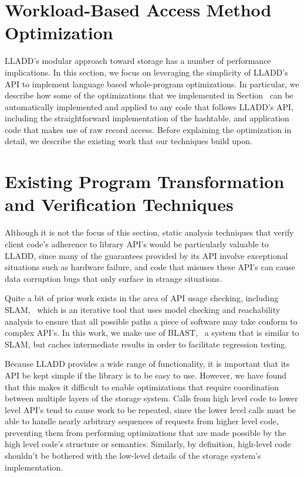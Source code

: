 \documentclass[10pt,letterpaper,twocolumn,english]{article}
\newcommand{\yad}{LLADD\xspace}
\begin{document}
\section{Workload-Based Access Method Optimization}
\label {PL}

\yad's modular approach toward storage has a number of performance
implications.  In this section, we focus on leveraging the simplicity
of \yad's API to implement language based whole-program optimizations.
In particular, we describe how some of the optimizations that we
implemented in Section~\label{optimzedHT} can be automatically
implemented and applied to any code that follows \yad's API, including
the straightforward implementation of the hashtable, and application
code that makes use of raw record access.  Before explaining the
optimization in detail, we describe the existing work that our
techniques build upon.


\section{Existing Program Transformation and Verification Techniques}

\label{prior}




Although it is not the focus of this section, static analysis techniques
that verify client code's adherence to library API's would be
particularly valuable to \yad, since many of the guarantees provided
by its API involve exceptional situations such as hardware failure,
and code that misuses these API's can cause data corruption bugs that
only surface in strange situations.  

Quite a bit of prior work exists
in the area of API usage checking, including SLAM,~\cite{slam} which is an
iterative tool that uses model checking and reachability analysis to
ensure that all possible paths a piece of software may take conform to
complex API's.  In this work, we make use of BLAST,~\cite{blast} a system that is
similar to SLAM, but caches intermediate results in order to
facilitate regression testing.

Because \yad provides a wide range of functionality, it is important
that its API be kept simple if the library is to be easy to use.
However, we have found that this makes it difficult to enable
optimizations that require coordination between multiple layers of the
storage system.  Calls from high level code to lower level API's
tend to cause work to be repeated, since the lower level calls must
be able to handle nearly arbitrary sequences of requests from higher
level code, preventing them from performing optimizations that are
made possible by the high level code's structure or semantics.
Similarly, by definition, high-level code shouldn't be bothered with
the low-level details of the storage system's implementation.
\end{document}
